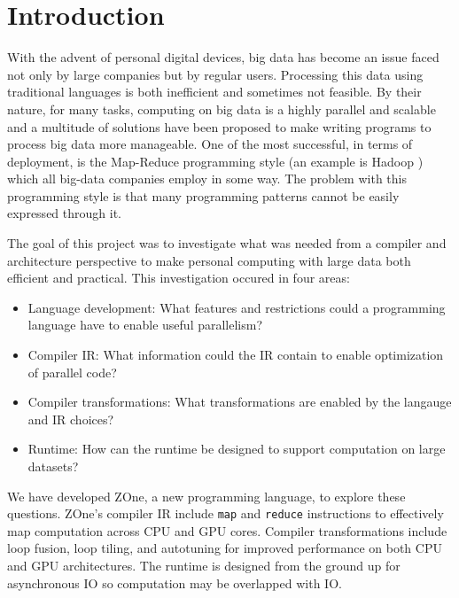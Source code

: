 \section*{Introduction}

With the advent of personal digital devices, big data has become an
issue faced not only by large companies but by regular users. Processing
this data using traditional languages is both inefficient and sometimes
not feasible. By their nature, for many tasks, computing on big data is
a highly parallel and scalable and a multitude of solutions have been
proposed to make writing programs to process big data more manageable.
One of the most successful, in terms of deployment, is the
Map-Reduce\cite{MapReduce} programming style (an example is Hadoop
\cite{Hadoop}) which
all big-data companies employ in some way. The problem with this
programming style is that many programming patterns cannot be easily
expressed through it.

The goal of this project was to investigate what was needed from a compiler and
architecture perspective to make personal computing with large data both
efficient and practical. This investigation occured in four areas:
\begin{itemize}
\item Language development: What features and restrictions could a
      programming language have to enable useful parallelism?
\item Compiler IR: What information could the IR contain to enable
      optimization of parallel code?
\item Compiler transformations: What transformations are enabled by
      the langauge and IR choices?
\item Runtime: How can the runtime be designed to support computation
      on large datasets?
\end{itemize}

We have developed ZOne, a new programming language, to explore
these questions. ZOne's compiler IR include \texttt{map} and 
\texttt{reduce} instructions to effectively map computation across
CPU and GPU cores. Compiler transformations include loop fusion,
loop tiling, and autotuning for improved performance on both CPU
and GPU architectures. The runtime is designed from the ground up
for asynchronous IO so computation may be overlapped with IO.

